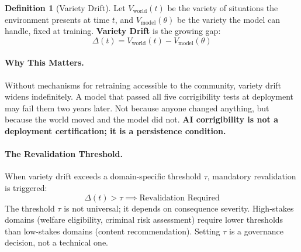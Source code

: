 \documentclass[11pt,a4paper]{article}
\theoremstyle{definition}
\newtheorem{definition}{Definition}[section]
\begin{document}
\begin{definition}[Variety Drift]
\label{def:variety-drift}
Let $V_{\text{world}}(t)$ be the variety of situations the environment presents at time $t$, and $V_{\text{model}}(\theta)$ be the variety the model can handle, fixed at training. \textbf{Variety Drift} is the growing gap:
\begin{equation}
\Delta(t) = V_{\text{world}}(t) - V_{\text{model}}(\theta)
\label{eq:variety-gap}
\end{equation}
\end{definition}

\paragraph{Why This Matters.} Without mechanisms for retraining accessible to the community, variety drift widens indefinitely. A model that passed all five corrigibility tests at deployment may fail them two years later. Not because anyone changed anything, but because the world moved and the model did not. \textbf{AI corrigibility is not a deployment certification; it is a persistence condition.}

\paragraph{The Revalidation Threshold.} When variety drift exceeds a domain-specific threshold $\tau$, mandatory revalidation is triggered:
\begin{equation}
\Delta(t) > \tau \implies \text{Revalidation Required}
\end{equation}
The threshold $\tau$ is not universal; it depends on consequence severity. High-stakes domains (welfare eligibility, criminal risk assessment) require lower thresholds than low-stakes domains (content recommendation). Setting $\tau$ is a governance decision, not a technical one.
\end{document}
